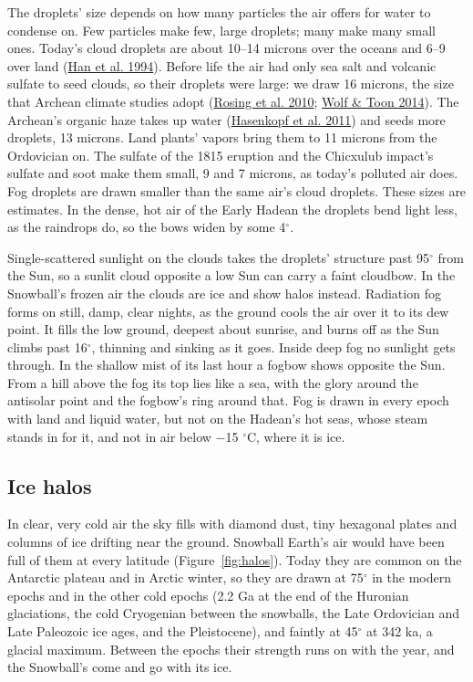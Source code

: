 \documentclass[9pt,twocolumn]{extarticle}
\begin{document}
The droplets' size depends on how many particles the air offers for water to condense on. Few particles make few, large droplets; many make many small ones. Today's cloud droplets are about 10--14 microns over the oceans and 6--9 over land (\protect\hyperlink{cite.han1994}{Han et al. 1994}). Before life the air had only sea salt and volcanic sulfate to seed clouds, so their droplets were large: we draw 16 microns, the size that Archean climate studies adopt (\protect\hyperlink{cite.rosing2010}{Rosing et al. 2010}; \protect\hyperlink{cite.wolf2014}{Wolf \& Toon 2014}). The Archean's organic haze takes up water (\protect\hyperlink{cite.hasenkopf2011}{Hasenkopf et al. 2011}) and seeds more droplets, 13 microns. Land plants' vapors bring them to 11 microns from the Ordovician on. The sulfate of the 1815 eruption and the Chicxulub impact's sulfate and soot make them small, 9 and 7 microns, as today's polluted air does. Fog droplets are drawn smaller than the same air's cloud droplets. These sizes are estimates. In the dense, hot air of the Early Hadean the droplets bend light less, as the raindrops do, so the bows widen by some 4$^\circ$.

Single-scattered sunlight on the clouds takes the droplets' structure past 95$^\circ$ from the Sun, so a sunlit cloud opposite a low Sun can carry a faint cloudbow. In the Snowball's frozen air the clouds are ice and show halos instead. Radiation fog forms on still, damp, clear nights, as the ground cools the air over it to its dew point. It fills the low ground, deepest about sunrise, and burns off as the Sun climbs past 16$^\circ$, thinning and sinking as it goes. Inside deep fog no sunlight gets through. In the shallow mist of its last hour a fogbow shows opposite the Sun. From a hill above the fog its top lies like a sea, with the glory around the antisolar point and the fogbow's ring around that. Fog is drawn in every epoch with land and liquid water, but not on the Hadean's hot seas, whose steam stands in for it, and not in air below $-$15 $^\circ$C, where it is ice.


\subsection{Ice halos}\label{ice-halos}

In clear, very cold air the sky fills with diamond dust, tiny hexagonal plates and columns of ice drifting near the ground. Snowball Earth's air would have been full of them at every latitude (Figure~\ref{fig:halos}). Today they are common on the Antarctic plateau and in Arctic winter, so they are drawn at 75$^\circ$ in the modern epochs and in the other cold epochs (2.2 Ga at the end of the Huronian glaciations, the cold Cryogenian between the snowballs, the Late Ordovician and Late Paleozoic ice ages, and the Pleistocene), and faintly at 45$^\circ$ at 342 ka, a glacial maximum. Between the epochs their strength runs on with the year, and the Snowball's come and go with its ice.
\end{document}
